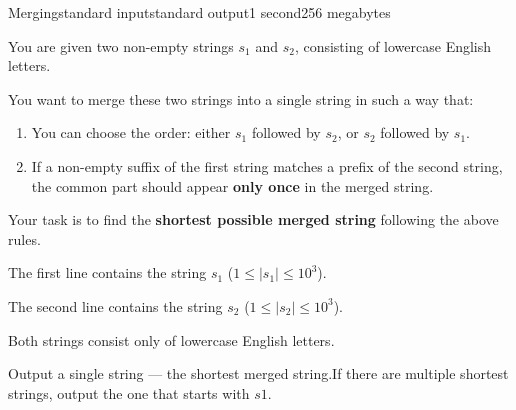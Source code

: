 \begin{problem}{Merging}{standard input}{standard output}{1 second}{256 megabytes}

You are given two non-empty strings $s_1$ and $s_2$, consisting of lowercase English letters.

You want to merge these two strings into a single string in such a way that:

\begin{enumerate}
    \item You can choose the order: either $s_1$ followed by $s_2$, or $s_2$ followed by $s_1$.
    \item If a non-empty suffix of the first string matches a prefix of the second string, the common part should appear \textbf{only once} in the merged string.
\end{enumerate}

Your task is to find the \textbf{shortest possible merged string} following the above rules.

\InputFile
The first line contains the string $s_1$ ($1 \le |s_1| \le 10^3$).

The second line contains the string $s_2$ ($1 \le |s_2| \le 10^3$).

Both strings consist only of lowercase English letters.



\OutputFile
Output a single string --- the shortest merged string.If there are multiple shortest strings, output the one that starts with $s1$.


\Examples

\begin{example}
%
%
%
%
\end{example}

\end{problem}

